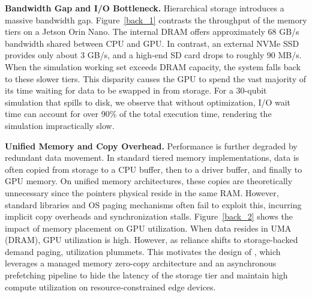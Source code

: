 \noindent\textbf{Bandwidth Gap and I/O Bottleneck.} Hierarchical storage introduces a massive bandwidth gap. Figure~\ref{back_1} contrasts the throughput of the memory tiers on a Jetson Orin Nano. The internal DRAM offers approximately 68 GB/s bandwidth shared between CPU and GPU. In contrast, an external NVMe SSD provides only about 3 GB/s, and a high-end SD card drops to roughly 90 MB/s. When the simulation working set exceeds DRAM capacity, the system falls back to these slower tiers. This disparity causes the GPU to spend the vast majority of its time waiting for data to be swapped in from storage. For a 30-qubit simulation that spills to disk, we observe that without optimization, I/O wait time can account for over 90\% of the total execution time, rendering the simulation impractically slow.

\noindent\textbf{Unified Memory and Copy Overhead.}
Performance is further degraded by redundant data movement. In standard tiered memory implementations, data is often copied from storage to a CPU buffer, then to a driver buffer, and finally to GPU memory. On unified memory architectures, these copies are theoretically unnecessary since the pointers physical reside in the same RAM. However, standard libraries and OS paging mechanisms often fail to exploit this, incurring implicit copy overheads and synchronization stalls. Figure~\ref{back_2} shows the impact of memory placement on GPU utilization. When data resides in UMA (DRAM), GPU utilization is high. However, as reliance shifts to storage-backed demand paging, utilization plummets. This motivates the design of \EdgeQuantum, which leverages a managed memory zero-copy architecture and an asynchronous prefetching pipeline to hide the latency of the storage tier and maintain high compute utilization on resource-constrained edge devices.